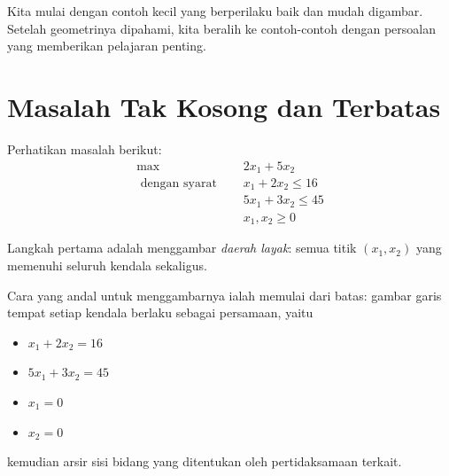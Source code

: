 Kita mulai dengan contoh kecil yang berperilaku baik dan mudah digambar. Setelah geometrinya dipahami, kita beralih ke contoh-contoh dengan persoalan yang memberikan pelajaran penting.


\section{Masalah Tak Kosong dan Terbatas}\label{sec:nonempty-bounded}

Perhatikan masalah berikut:
\begin{align*}
\max \quad & 2 x_1+5 x_2 \\
\text { dengan syarat } \quad
&x_1+2 x_2 \leq 16 \\
&5 x_1+3 x_2 \leq  45 \\
&x_1, x_2  \geq 0
\end{align*}

Langkah pertama adalah menggambar \emph{daerah layak}: semua titik $(x_1, x_2)$ yang memenuhi seluruh kendala sekaligus.

Cara yang andal untuk menggambarnya ialah memulai dari batas: gambar garis tempat setiap kendala berlaku sebagai persamaan, yaitu
\begin{itemize}
\item $x_1+2 x_2 = 16$
\item $5 x_1+3 x_2 = 45$
\item $x_1 = 0$
\item $x_2= 0$
\end{itemize}
kemudian arsir sisi bidang yang ditentukan oleh pertidaksamaan terkait.

